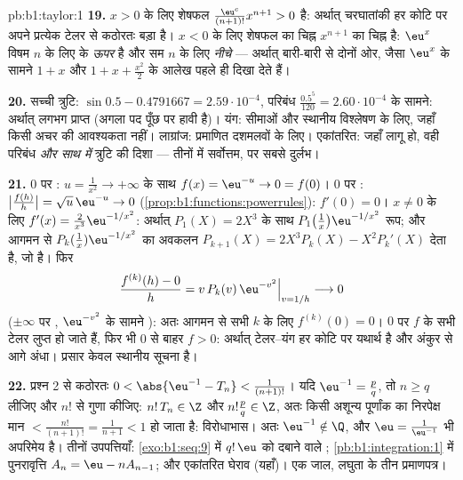 \begin{solution}{pb:b1:taylor:1}
\textbf{19.} $x > 0$ के लिए शेषफल $\frac{\eu^{c}} {(n+1)!}x^{n+1} > 0$ है:
अर्थात् चरघातांकी हर कोटि पर अपने प्रत्येक टेलर  से कठोरतः बड़ा है। $x
< 0$ के लिए शेषफल का चिह्न $x^{n+1}$ का चिह्न है: $\eu^x$ विषम $n$ के लिए
 के \emph{ऊपर} है और सम $n$ के लिए \emph{नीचे} --- अर्थात् बारी-बारी से
दोनों ओर, जैसा $\eu^x$ के सामने $1 + x$ और $1 + x + \frac{x^2}{2}$ के आलेख
पहले ही दिखा देते हैं।

\textbf{20.} सच्ची त्रुटि: $\sin 0.5 - 0.4791667 = 2.59\cdot10^{-4}$, परिबंध
$\frac{0.5^5}{120} = 2.60\cdot10^{-4}$ के सामने: अर्थात् लगभग प्राप्त (अगला
पद पूँछ पर हावी है)। यंग: सीमाओं और स्थानीय विश्लेषण के लिए, जहाँ किसी अचर
की आवश्यकता नहीं। लाग्रांज: प्रमाणित दशमलवों के लिए। एकांतरित: जहाँ लागू हो,
वही परिबंध \emph{और साथ में} त्रुटि की दिशा --- तीनों में सर्वोत्तम, पर सबसे
दुर्लभ।

\textbf{21.} $0$ पर : $u = \frac{1}{x^2} \to +\infty$ के साथ $f(x) =
\eu^{-u} \to 0 = f(0)$। $0$ पर : $\bigl|\frac{f(h)}{h}\bigr| = \sqrt
u\,\eu^{-u} \to 0$ (\cref{prop:b1:functions:powerrules}): $f'(0) = 0$। $x
\neq 0$ के लिए $f'(x) = \frac{2}{x^3}\eu^{-1/x^2}$: अर्थात् $P_1(X) = 2X^3$
के साथ $P_1\bigl(\frac1x\bigr)\eu^{-1/x^2}$ रूप; और आगमन से
$P_k(\frac1x)\eu^{-1/x^2}$ का अवकलन $P_{k+1}(X) = 2X^3 P_k(X) - X^2 P_k'(X)$
देता है, जो  है। फिर
\[
\frac{f^{(k)}(h) - 0}{h} = v\,P_k(v)\,\eu^{-v^2}
\Big|_{v = 1/h} \longrightarrow 0
\]
($\pm\infty$ पर , $\eu^{-v^2}$ के सामने ): अतः आगमन से सभी
$k$ के लिए $f^{(k)}(0) = 0$। $0$ पर $f$ के सभी टेलर  लुप्त हो जाते हैं,
फिर भी $0$ से बाहर $f > 0$: अर्थात् टेलर--यंग हर कोटि पर यथार्थ है और अंकुर
से आगे अंधा। प्रसार केवल स्थानीय सूचना है।

\textbf{22.} प्रश्न 2 से कठोरतः $0 < \abs{\eu^{-1} - T_n} <
\frac{1}{(n+1)!}$। यदि $\eu^{-1} = \frac pq$, तो $n \geq q$ लीजिए और $n!$ से
गुणा कीजिए: $n!\,T_n \in \Z$ और $n!\frac pq \in \Z$, अतः किसी अशून्य
पूर्णांक का निरपेक्ष मान $< \frac{n!}{(n+1)!} = \frac{1}{n+1} < 1$ हो जाता
है: विरोधाभास। अतः $\eu^{-1} \notin \Q$, और $\eu = \frac{1}{\eu^{-1}}$ भी
अपरिमेय है। तीनों उपपत्तियाँ: \cref{exo:b1:seq:9} में $q!\,\eu$ को दबाने
वाले ; \cref{pb:b1:integration:1} में  पुनरावृत्ति $A_n =
\eu - nA_{n-1}$; और एकांतरित घेराव (यहाँ)। एक जाल, लघुता के तीन प्रमाणपत्र।


\end{solution}
